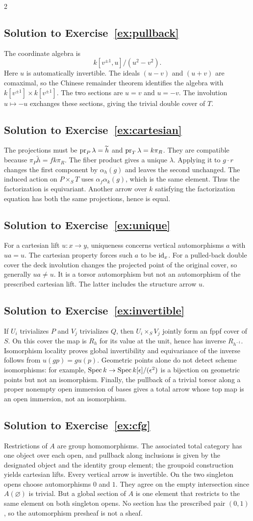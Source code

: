 \documentclass[12pt]{memoir}
\newcommand{\BGsolution}[1]{\subsection*{Solution to Exercise~\ref{#1}}\label{sol:#1}}
\begin{document}
\begin{multicols}{2}
\BGsolution{ex:pullback}
The coordinate algebra is
\[
 k[v^{\pm1},u]/(u^2-v^2).
\]
Here $u$ is automatically invertible. The ideals $(u-v)$ and $(u+v)$
are comaximal, so the Chinese remainder theorem identifies the algebra
with $k[v^{\pm1}]\times k[v^{\pm1}]$. The two sections are $u=v$ and
$u=-v$. The involution $u\mapsto-u$ exchanges these sections, giving
the trivial double cover of $T$.

\BGsolution{ex:cartesian}
The projections must be $\operatorname{pr}_P\lambda=\widetilde h$ and
$\operatorname{pr}_T\lambda=k\pi_R$. They are compatible because
$\pi_P\widetilde h=fk\pi_R$. The fiber product gives a unique
$\lambda$. Applying it to $g\cdot r$ changes the first component by
$\alpha_h(g)$ and leaves the second unchanged. The induced action on
$P\times_S T$ uses $\alpha_f\alpha_k(g)$, which is the same element.
Thus the factorization is equivariant. Another arrow over $k$ satisfying
the factorization equation has both the same projections, hence is equal.

\BGsolution{ex:unique}
For a cartesian lift $u:x\to y$, uniqueness concerns vertical
automorphisms $a$ with $ua=u$. The cartesian property forces such $a$
to be $\operatorname{id}_x$. For a pulled-back double cover the deck involution changes
the projected point of the original cover, so generally $ua\ne u$.
It is a torsor automorphism but not an automorphism of the prescribed
cartesian lift. The latter includes the structure arrow $u$.

\BGsolution{ex:invertible}
If $U_i$ trivializes $P$ and $V_j$ trivializes $Q$, then
$U_i\times_S V_j$ jointly form an fppf cover of $S$. On this cover the
map is $R_h$ for its value at the unit, hence has inverse $R_{h^{-1}}$.
Isomorphism locality proves global invertibility and equivariance of
the inverse follows from $u(gp)=gu(p)$. Geometric points alone do not
detect scheme isomorphisms: for example, $\operatorname{Spec} k\to
\operatorname{Spec} k[\epsilon]/(\epsilon^2)$ is a bijection on geometric points
but not an isomorphism. Finally, the pullback of a trivial torsor along
a proper nonempty open immersion of bases gives a total arrow whose
top map is an open immersion, not an isomorphism.

\BGsolution{ex:cfg}
Restrictions of $A$ are group homomorphisms. The associated total
category has one object over each open, and pullback along inclusions
is given by the designated object and the identity group element; the
groupoid construction yields cartesian lifts. Every vertical arrow is
invertible. On the two singleton opens choose automorphisms $0$ and $1$.
They agree on the empty intersection since $A(\varnothing)$ is trivial.
But a global section of $A$ is one element that restricts to the same
element on both singleton opens. No section has the prescribed pair
$(0,1)$, so the automorphism presheaf is not a sheaf.


\end{multicols}
\end{document}
